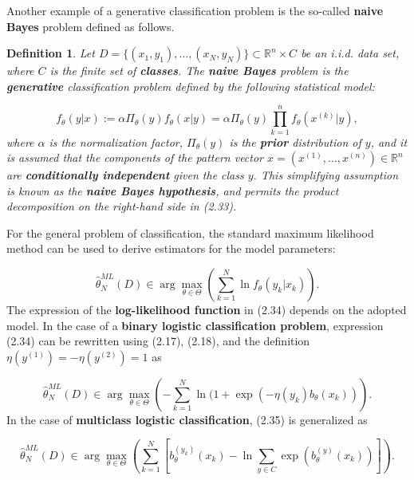 \documentclass{report}
\newtheorem{definition}{Definition}[chapter]
\begin{document}
Another example of a generative classification problem is the so-called \textbf{naive Bayes} problem defined as follows.

\begin{definition}
Let $D = \{(x_1,y_1),\dots,(x_N,y_N)\} \subset \mathbb{R}^n \times C$ be an i.i.d. data set, where $C$ is the finite set of \textbf{classes}. The \textbf{naive Bayes} problem is the \textbf{generative} classification problem defined by the following statistical model:

\begin{equation}
f_\theta(y|x) := \alpha \Pi_\theta(y) f_\theta(x|y) = \alpha \Pi_\theta(y) \prod_{k=1}^n f_\theta(x^{(k)}|y),
\end{equation}
where $\alpha$ is the normalization factor, $\Pi_\theta(y)$ is the \textbf{prior} distribution of $y$, and it is assumed that the components of the pattern vector $x = (x^{(1)},\dots,x^{(n)}) \in \mathbb{R}^n$ are \textbf{conditionally independent} given the class $y$. This simplifying assumption is known as the \textbf{naive Bayes hypothesis}, and permits the product decomposition on the right-hand side in (2.33).
\end{definition}
For the general problem of classification, the standard maximum likelihood method can be used to derive estimators for the model parameters:

\begin{equation}
\hat{\theta}^{ML}_N(D) \in \arg \max_{\theta \in \Theta} \left(\sum_{k=1}^N \ln f_\theta(y_k|x_k)\right).
\end{equation}
The expression of the \textbf{log-likelihood function} in (2.34) depends on the adopted model. In the case of a \textbf{binary logistic classification problem}, expression (2.34) can be rewritten using (2.17), (2.18), and the definition $\eta(y^{(1)}) = -\eta(y^{(2)}) = 1$ as

\begin{equation}
\hat{\theta}^{ML}_N(D) \in \arg \max_{\theta \in \Theta} \left(-\sum_{k=1}^N \ln(1+\exp(-\eta(y_k)b_\theta(x_k))\right).
\end{equation}
In the case of \textbf{multiclass logistic classification}, (2.35) is generalized as

\begin{equation}
\hat{\theta}^{ML}_N(D) \in \arg \max_{\theta \in \Theta} \left(
\sum_{k=1}^N\left[b_\theta^{(y_k)}(x_k) - \ln \sum_{y \in C} \exp(b_\theta^{(y)}(x_k))\right]\right).
\end{equation}
\end{document}
